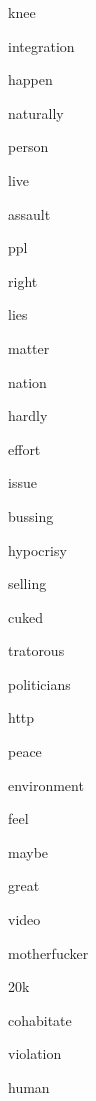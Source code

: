 \documentclass[varwidth]{standalone}
\begin{document}
\begin{CJK*}{UTF8}{gbsn}
{{{\colorbox{red!4.060935020446777}{\strut knee}
\colorbox{red!3.7849960327148438}{\strut integration}
\colorbox{red!9.214947700500488}{\strut happen}
\colorbox{red!6.208691596984863}{\strut naturally}
\colorbox{red!3.5844221115112305}{\strut person}
\colorbox{red!4.803780555725098}{\strut live}
\colorbox{red!5.807353973388672}{\strut assault}
\colorbox{red!14.071943283081055}{\strut ppl}
\colorbox{red!8.587324142456055}{\strut right}
\colorbox{red!5.883591651916504}{\strut lies}
\colorbox{red!6.666765213012695}{\strut matter}
\colorbox{red!7.7271223068237305}{\strut nation}
\colorbox{red!8.628454208374023}{\strut hardly}
\colorbox{red!6.968061447143555}{\strut effort}
\colorbox{red!8.51142692565918}{\strut issue}
\colorbox{red!6.611754417419434}{\strut bussing}
\colorbox{red!11.241256713867188}{\strut hypocrisy}
\colorbox{red!7.085257530212402}{\strut selling}
\colorbox{red!9.087942123413086}{\strut cuked}
\colorbox{red!14.626180648803711}{\strut tratorous}
\colorbox{red!7.519392013549805}{\strut politicians}
\colorbox{red!2.3101444244384766}{\strut http}
\colorbox{red!7.791255950927734}{\strut peace}
\colorbox{red!9.802766799926758}{\strut environment}
\colorbox{red!5.434414863586426}{\strut feel}
\colorbox{red!8.223812103271484}{\strut maybe}
\colorbox{red!8.868667602539062}{\strut great}
\colorbox{red!4.365260124206543}{\strut video}
\colorbox{red!6.764534950256348}{\strut motherfucker}
\colorbox{red!10.115364074707031}{\strut 20k}
\colorbox{red!9.08517837524414}{\strut cohabitate}
\colorbox{red!6.040884971618652}{\strut violation}
\colorbox{red!8.096400260925293}{\strut human}

}}}
\end{CJK*}
\end{document}
